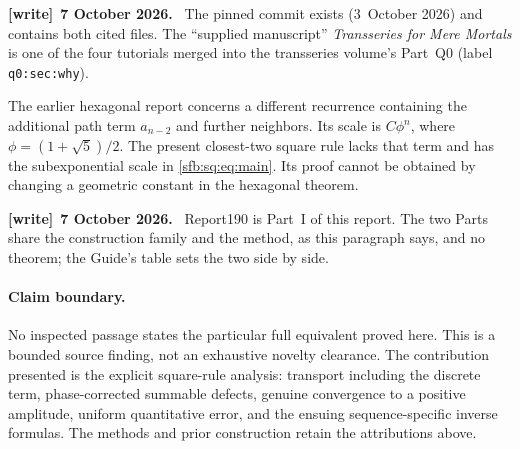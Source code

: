 \documentclass[11pt]{article}
\theoremstyle{remark}\newtheorem{remark}[theorem]{Remark}
\newcommand{\file}[1]{\nolinkurl{#1}}
\newenvironment{writenote}[1][]{\par\smallskip\begingroup\small
 \noindent\textbf{[write]}\if\relax\detokenize{#1}\relax\else~\textbf{#1.}\fi\ }%
 {\par\endgroup\smallskip}
\begin{document}
\begin{writenote}[7 October 2026]
The pinned commit exists (3~October 2026) and contains both cited files. The ``supplied manuscript'' \emph{Transseries for Mere Mortals} is one of the four tutorials merged into the transseries volume's Part~Q0 (label \file{q0:sec:why}).
\end{writenote}

The earlier hexagonal report \cite{report190} concerns a different recurrence containing the additional path term $a_{n-2}$ and further neighbors. Its scale is $C\phi^n$, where $\phi=(1+\sqrt5)/2$. The present closest-two square rule lacks that term and has the subexponential scale in \eqref{sfb:sq:eq:main}. Its proof cannot be obtained by changing a geometric constant in the hexagonal theorem.

\begin{writenote}[7 October 2026]
Report190 is Part~I of this report. The two Parts share the construction family and the method, as this paragraph says, and no theorem; the Guide's table sets the two side by side.
\end{writenote}

\paragraph{Claim boundary.}
No inspected passage states the particular full equivalent proved here. This is a bounded source finding, not an exhaustive novelty clearance. The contribution presented is the explicit square-rule analysis: transport including the discrete term, phase-corrected summable defects, genuine convergence to a positive amplitude, uniform quantitative error, and the ensuing sequence-specific inverse formulas. The methods and prior construction retain the attributions above.
\end{document}
